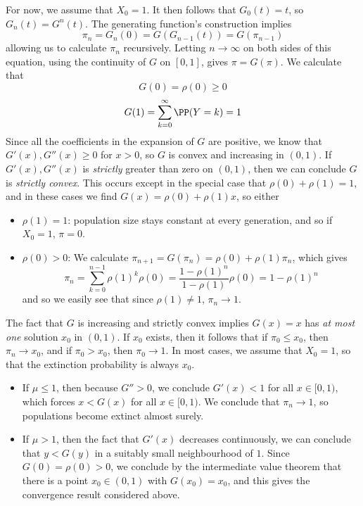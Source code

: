 For now, we assume that $X_0 = 1$. It then follows that $G_0(t) = t$, so $G_n(t) = G^n(t)$. The generating function's construction implies
%
\[ \pi_n = G_n(0) = G(G_{n-1}(t)) = G(\pi_{n-1}) \]
%
allowing us to calculate $\pi_n$ recursively. Letting $n \to \infty$ on both sides of this equation, using the continuity of $G$ on $[0,1]$, gives $\pi = G(\pi)$. We calculate that
%
\[ G(0) = \rho(0) \geq 0 \]
%
\[ G(1) = \sum_{k = 0}^\infty \PP(Y = k) = 1 \]
%
Since all the coefficients in the expansion of $G$ are positive, we know that $G'(x), G''(x) \geq 0$ for $x > 0$, so $G$ is convex and increasing in $(0,1)$. If $G'(x), G''(x)$ is {\it strictly} greater than zero on $(0,1)$, then we can conclude $G$ is {\it strictly convex}. This occurs except in the special case that $\rho(0) + \rho(1) = 1$, and in these cases we find $G(x) = \rho(0) + \rho(1) x$, so either
%
\begin{itemize}
    \item $\rho(1) = 1$: population size stays constant at every generation, and so if $X_0 = 1$, $\pi = 0$.

    \item $\rho(0) > 0$: We calculate $\pi_{n+1} = G(\pi_n) = \rho(0) + \rho(1) \pi_n$, which gives
    \[ \pi_n = \sum_{k = 0}^{n-1} \rho(1)^k \rho(0) = \frac{1 - \rho(1)^n}{1 - \rho(1)} \rho(0) = 1 - \rho(1)^n \]
    and so we easily see that since $\rho(1) \neq 1$, $\pi_n \to 1$.
\end{itemize}
%
The fact that $G$ is increasing and strictly convex implies $G(x) = x$ has {\it at most one} solution $x_0$ in $(0,1)$. If $x_0$ exists, then it follows that if $\pi_0 \leq x_0$, then $\pi_n \to x_0$, and if $\pi_0 > x_0$, then $\pi_0 \to 1$. In most cases, we assume that $X_0 = 1$, so that the extinction probability is always $x_0$.
%
\begin{itemize}
    \item If $\mu \leq 1$, then because $G'' > 0$, we conclude $G'(x) < 1$ for all $x \in [0,1)$, which forces $x < G(x)$ for all $x \in [0,1)$. We conclude that $\pi_n \to 1$, so populations become extinct almost surely.

    \item If $\mu > 1$, then the fact that $G'(x)$ decreases continuously, we can conclude that $y < G(y)$ in a suitably small neighbourhood of $1$. Since $G(0) = \rho(0) > 0$, we conclude by the intermediate value theorem that there is a point $x_0 \in (0,1)$ with $G(x_0) = x_0$, and this gives the convergence result considered above.
\end{itemize}

